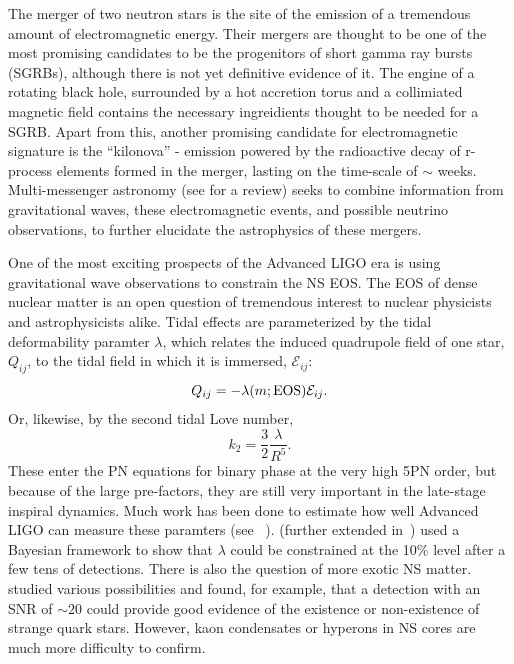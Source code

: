 The merger of two neutron stars is the site of the emission of a tremendous amount of electromagnetic energy. Their mergers are thought to be one of the most promising candidates to be the progenitors of short gamma ray bursts (SGRBs), although there is not yet definitive evidence of it. The engine of a rotating black hole, surrounded by a hot accretion torus and a collimiated magnetic field contains the necessary ingreidients thought to be needed for a SGRB. Apart from this, another promising candidate for electromagnetic signature is the ``kilonova'' - emission powered by the radioactive decay of r-process elements formed in the merger, lasting on the time-scale of $\sim$ weeks. Multi-messenger astronomy (see \cite{Fan:2015bia} for a review) seeks to combine information from gravitational waves, these electromagnetic events, and possible neutrino observations, to further elucidate the astrophysics of these mergers.

One of the most exciting prospects of the Advanced LIGO era is using gravitational wave observations to constrain the NS EOS. The EOS of dense nuclear matter is an open question of tremendous interest to nuclear physicists and astrophysicists alike. Tidal effects are parameterized by the tidal deformability paramter $\lambda$, which relates the induced quadrupole field of one star, $Q_{ij}$, to the tidal field in which it is immersed, $\mathcal{E}_{ij}$:
\begin{equation}
Q_{ij}=-\lambda(m;{\rm EOS})\mathcal{E}_{ij}.
\end{equation}
Or, likewise, by the second tidal Love number,
\begin{equation}
k_2=\frac{3}{2}\frac{\lambda}{R^5}.
\end{equation}
These enter the PN equations for binary phase at the very high 5PN order, but because of the large pre-factors, they are still very important in the late-stage inspiral dynamics. Much work has been done to estimate how well Advanced LIGO can measure these paramters (see ~\cite{Read2009b,Hinderer2010,damour:12,Lackey2011}). \cite{DelPozzo:13} (further extended in~\cite{Agathos:2015a}) used a Bayesian framework to show that $\lambda$ could be constrained at the 10\% level after a few tens of detections. There is also the question of more exotic NS matter. \cite{Chatziioannou:2015uea} studied various possibilities and found, for example, that a detection with an SNR of $\sim 20$ could provide good evidence of the existence or non-existence of strange quark stars. However, kaon condensates or hyperons in NS cores are much more difficulty to confirm.

